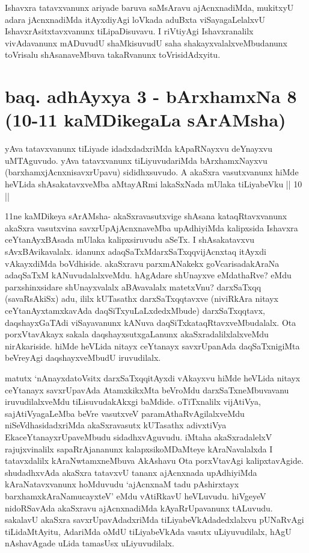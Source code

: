 \begin{artha}
Ishavxra tatavxvanunx ariyade baruva saMsAravu ajAcnxnadiMda, mukitxyU adara jAcnxnadiMda itAyxdiyAgi loVkada aduBxta viSayagaLelalxvU IshavxrAsitxtavxvanunx tiLipaDisuvavu. I riVtiyAgi Ishavxranalilx vivAdavanunx mADuvudU shaMkisuvudU saha shakayxvalalxveMbudanunx toVrisalu shAsanaveMbuva takaRvanunx toVrisidAdxyitu.
\end{artha}

\section*{baq. adhAyxya 3 - bArxhamxNa 8 (10-11 kaMDikegaLa sArAMsha)}

\begin{artha}
yAva tatavxvanunx tiLiyade idadxdadxriMda kApaRNayxvu deYnayxvu uMTAguvudo. yAva tatavxvanunx tiLiyuvudariMda bArxhamxNayxvu (barxhamxjAcnxnisavxrUpavu) sididhxsuvudo. A akaSxra vasutxvanunx hiMde heVLida shAsakatavxveMba aMtayARmi lakaSxNada mUlaka tiLiyabeVku || 10 ||
\end{artha}

\begin{artha}
11ne kaMDikeya sArAMsha- akaSxravasutxvige shAsana kataqRtavxvanunx akaSxra vasutxvina savxrUpAjAcnxnaveMba upAdhiyiMda kalipxsida Ishavxra ceYtanAyxBAsada mUlaka kalipxsiruvudu aSeTx. I shAsakatavxvu sAvxBAvikavalalx. idanunx adaqSaTxMdarxSaTxqq\mdash vijAcnxtaq itAyxdi vAkayxdiMda boVdhiside. akaSxravu parxmANakekx goVcarisadakAraNa adaqSaTxM kANuvudalalxveMdu. hAgAdare shUnayxve eMdathaRve? eMdu parxshinxsidare shUnayxvalalx aBAvavalalx matetxVnu? darxSaTxqq (savaRsAkiSx) adu, ililx kUTasathx darxSaTxqqtavxve (niviRkAra nitayx ceYtanAyxtamxkavAda daqSiTxyuLaLxdedxMbude) darxSaTxqqtavx, daqshayxGaTAdi viSayavanunx kANuva daqSiTxkataqRtavxveMbudalalx. Ota porxVtavAkayx sakala daqshayxsutxgaLanunx akaSxradalilxlalxveMdu nirAkariside. hiMde heVLida nitayx ceYtanayx savxrUpanAda daqSaTxnigiMta beVreyAgi daqshayxveMbudU iruvudilalx. 
\end{artha}%

\begin{artha}
matutx `nAnayxdatoV\s sitx darxSaTxqq\ndash itAyxdi vAkayxvu hiMde heVLida nitayx ceYtanayx savxrUpavAda AtamxkikxMta beVroMdu darxSaTxneMbuvavanu iruvudilalxveMdu tiLisuvudakAkxgi baMdide. oTiTxnalilx vijAtiVya, sajAtiVyagaLeMba beVre vasutxveV paramAthaRvAgilalxveMdu niSeVdhasidadxriMda akaSxravasutx kUTasathx adivxtiVya EkaceYtanayxrUpaveMbudu sidadhxvAguvudu. iMtaha akaSxradalelxV rajujxvinalilx sapaRrAjananunx kalapxsikoMDaMteye kAraNavalalxda I tatavxdalilx kAraNwtamxneMbuva AkAshavu Ota porxVtavAgi kalipxtavAgide. shudadhxvAda akaSxra tatavxvU tananx ajAcnxnada upAdhiyiMda kAraNatavxvanunx hoMduvudu `ajAcnxnaM tadu pAshirxtayx barxhamxkAraNamucayxteV' eMdu vAtiRkavU heVLuvudu. hiVgeyeV nidoRSavAda akaSxravu ajAcnxnadiMda kAyaRrUpavanunx tALuvudu. sakalavU akaSxra savxrUpavAdadxriMda tiLiyabeVkAdadedxlalxvu pUNaRvAgi tiLidaMtAyitu, AdariMda oMdU tiLiyabeVkAda vasutx uLiyuvudilalx, hAgU nAshavAgade uLida tamasUsx uLiyuvudilalx.
\end{artha}%

